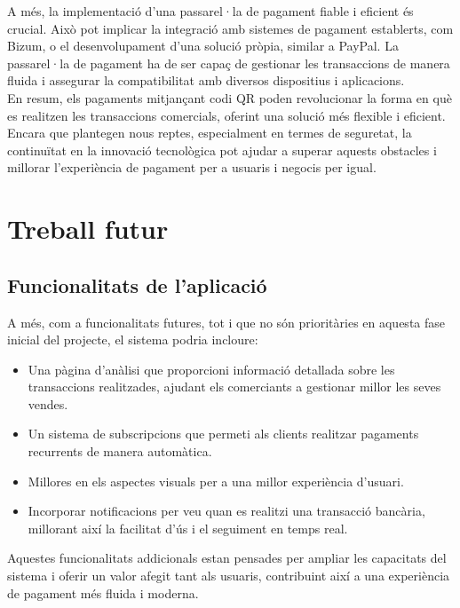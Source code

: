 \documentclass[a4paper,12pt,twoside]{ThesisStyle}
\begin{document}
A més, la implementació d'una passarel·la de pagament fiable i eficient és crucial. Això pot implicar la integració amb sistemes de pagament establerts, com Bizum, o el desenvolupament d'una solució pròpia, similar a PayPal. La passarel·la de pagament ha de ser capaç de gestionar les transaccions de manera fluida i assegurar la compatibilitat amb diversos dispositius i aplicacions.\\


En resum, els pagaments mitjançant codi QR poden revolucionar la forma en què es realitzen les transaccions comercials, oferint una solució més flexible i eficient. Encara que plantegen nous reptes, especialment en termes de seguretat, la continuïtat en la innovació tecnològica pot ajudar a superar aquests obstacles i millorar l'experiència de pagament per a usuaris i negocis per igual.\\




\chapter{Treball futur}
\label{chp:treballfutur}



\section{Funcionalitats de l'aplicació}
\label{sec: Funcionalitats de l'aplicació}

A més, com a funcionalitats futures, tot i que no són prioritàries en aquesta fase inicial del projecte, el sistema podria incloure:

\begin{itemize}
\item Una pàgina d'anàlisi que proporcioni informació detallada sobre les transaccions realitzades, ajudant els comerciants a gestionar millor les seves vendes.
\item Un sistema de subscripcions que permeti als clients realitzar pagaments recurrents de manera automàtica.
\item Millores en els aspectes visuals per a una millor experiència d'usuari.
\item Incorporar notificacions per veu quan es realitzi una transacció bancària, millorant així la facilitat d'ús i el seguiment en temps real.
\end{itemize}

Aquestes funcionalitats addicionals estan pensades per ampliar les capacitats del sistema i oferir un valor afegit tant als usuaris, contribuint així a una experiència de pagament més fluida i moderna.
\end{document}

